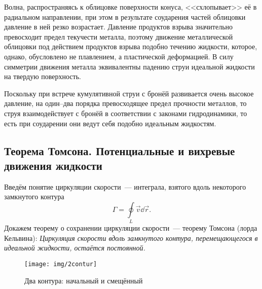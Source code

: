 Волна, распространяясь к облицовке поверхности конуса, <<схлопывает>> её в радиальном направлении, при этом в результате соударения частей облицовки давление в ней резко возрастает. Давление продуктов взрыва значительно превосходит предел текучести металла, поэтому движение металлической облицовки под действием продуктов взрыва подобно течению жидкости, которое, однако, обусловлено не плавлением, а пластической деформацией.
В силу симметрии  движения металла эквивалентны падению струи идеальной жидкости на твердую поверхность.


Поскольку при встрече кумулятивной струи с бронёй развивается очень высокое давление, на один--два порядка превосходящее предел прочности металлов, то струя взаимодействует с бронёй в соответствии с законами гидродинамики, то есть при соударении они ведут себя подобно идеальным жидкостям.



\subsection{Теорема Томсона. Потенциальные и вихревые движения жидкости}

Введём понятие циркуляции скорости~--- интеграла, взятого вдоль некоторого замкнутого контура
\begin{equation}
\Gamma = \oint \limits_ { L } \vec{v} \dd{\vec{r}}.
\end{equation}
Докажем теорему о сохранении циркуляции скорости~--- теорему Томсона (лорда Кельвина):
\textit{Циркуляция скорости вдоль замкнутого контура, перемещающегося в идеальной жидкости, остаётся постоянной.}

\begin{figure}[ht!]
	\centering
	\texttt{[image: img/2contur]}
	\caption{Два контура: начальный и смещённый}
	\label{fig:2contur}
\end{figure}

